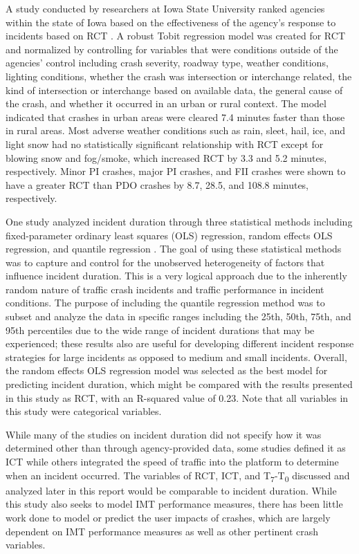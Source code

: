 \documentclass[
  letterpaper,
  authoryear]{elsarticle}
\begin{document}
A study conducted by researchers at Iowa State University ranked
agencies within the state of Iowa based on the effectiveness of the
agency's response to incidents based on RCT
\citep{mumtarin_traffic_2023}. A robust Tobit regression model was
created for RCT and normalized by controlling for variables that were
conditions outside of the agencies' control including crash severity,
roadway type, weather conditions, lighting conditions, whether the crash
was intersection or interchange related, the kind of intersection or
interchange based on available data, the general cause of the crash, and
whether it occurred in an urban or rural context. The model indicated
that crashes in urban areas were cleared 7.4 minutes faster than those
in rural areas. Most adverse weather conditions such as rain, sleet,
hail, ice, and light snow had no statistically significant relationship
with RCT except for blowing snow and fog/smoke, which increased RCT by
3.3 and 5.2 minutes, respectively. Minor PI crashes, major PI crashes,
and FII crashes were shown to have a greater RCT than PDO crashes by
8.7, 28.5, and 108.8 minutes, respectively.

One study analyzed incident duration through three statistical methods
including fixed-parameter ordinary least squares (OLS) regression,
random effects OLS regression, and quantile regression
\citep{wali_heterogeneity_2022}. The goal of using these statistical
methods was to capture and control for the unobserved heterogeneity of
factors that influence incident duration. This is a very logical
approach due to the inherently random nature of traffic crash incidents
and traffic performance in incident conditions. The purpose of including
the quantile regression method was to subset and analyze the data in
specific ranges including the 25th, 50th, 75th, and 95th percentiles due
to the wide range of incident durations that may be experienced; these
results also are useful for developing different incident response
strategies for large incidents as opposed to medium and small incidents.
Overall, the random effects OLS regression model was selected as the
best model for predicting incident duration, which might be compared
with the results presented in this study as RCT, with an R-squared value
of 0.23. Note that all variables in this study were categorical
variables.

While many of the studies on incident duration did not specify how it
was determined other than through agency-provided data, some studies
defined it as ICT while others integrated the speed of traffic into the
platform to determine when an incident occurred. The variables of RCT,
ICT, and T\textsubscript{7}-T\textsubscript{0} discussed and analyzed
later in this report would be comparable to incident duration. While
this study also seeks to model IMT performance measures, there has been
little work done to model or predict the user impacts of crashes, which
are largely dependent on IMT performance measures as well as other
pertinent crash variables.
\end{document}
